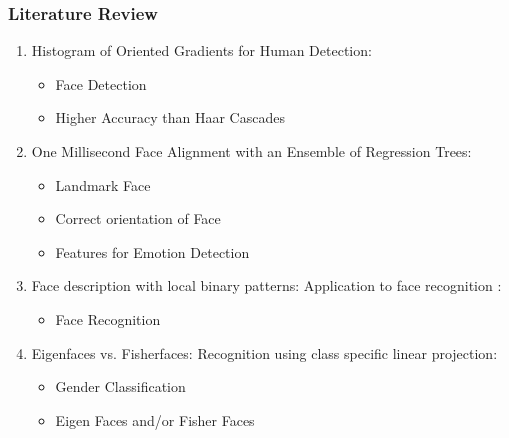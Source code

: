 \documentclass{beamer}
\begin{document}
	\begin{frame}[allowframebreaks=0.9]
		\frametitle{Literature Review}
		
		\begin{enumerate}[1)]
			\item Histogram of Oriented Gradients for Human Detection\cite{dalal2005histograms}: \newline
			\begin{itemize}
				\item Face Detection \newline
				\item Higher Accuracy than Haar Cascades \newline
			\end{itemize}
			
			\item One Millisecond Face Alignment with an Ensemble of Regression Trees\cite{kazemi2014one}: \newline
			\begin{itemize}
				\item Landmark Face \newline
				\item Correct orientation of Face \newline
				\item Features for Emotion Detection \newline
				
			\end{itemize}
			
			\item Face description with local binary patterns: Application to face recognition \cite{ahonen2006face}\cite{face}: \newline
			\begin{itemize}
				\item Face Recognition \newline
			\end{itemize}
			
			\item Eigenfaces vs. Fisherfaces: Recognition using class specific linear projection\cite{belhumeur1997eigenfaces}\cite{gender}: \newline
			\begin{itemize}
				\item Gender Classification \newline
				\item Eigen Faces and/or Fisher Faces \newline
				
			\end{itemize}
			
			
		\end{enumerate}		
		
	\end{frame}	
	
\end{document}

